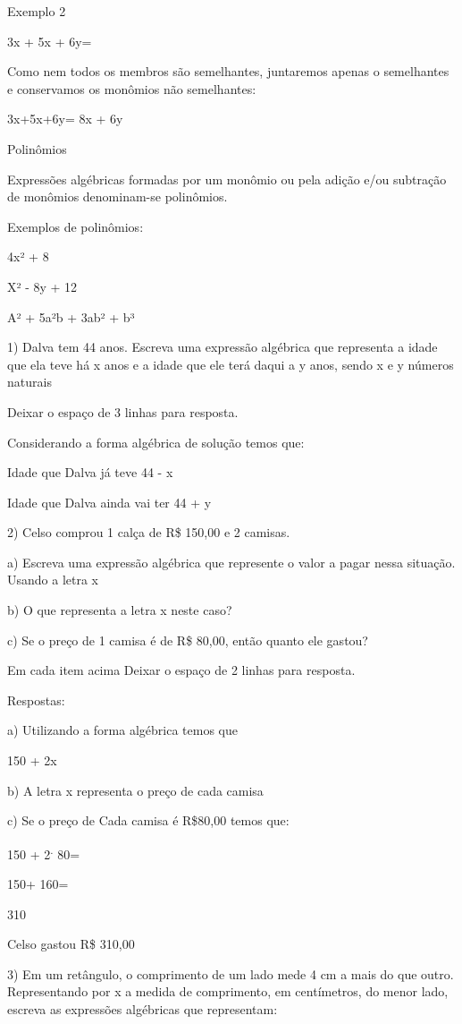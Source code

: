 {Exemplo 2

3x + 5x + 6y=

Como nem todos os membros são semelhantes, juntaremos apenas o
semelhantes e conservamos os monômios não semelhantes:

3x+5x+6y= 8x + 6y

Polinômios

Expressões algébricas formadas por um monômio ou pela adição e/ou
subtração de monômios denominam-se polinômios.

Exemplos de polinômios:

4x² + 8

X² - 8y + 12

A² + 5a²b + 3ab² + b³


1) Dalva tem 44 anos. Escreva uma expressão algébrica que representa a
idade que ela teve há x anos e a idade que ele terá daqui a y anos,
sendo x e y números naturais

Deixar o espaço de 3 linhas para resposta.

Considerando a forma algébrica de solução temos que:

Idade que Dalva já teve 44 - x

Idade que Dalva ainda vai ter 44 + y

2) Celso comprou 1 calça de R\$ 150,00 e 2 camisas.

a) Escreva uma expressão algébrica que represente o valor a pagar nessa
situação. Usando a letra x

b) O que representa a letra x neste caso?

c) Se o preço de 1 camisa é de R\$ 80,00, então quanto ele gastou?

Em cada item acima Deixar o espaço de 2 linhas para resposta.

Respostas:

a) Utilizando a forma algébrica temos que

150 + 2x

b) A letra x representa o preço de cada camisa

c) Se o preço de Cada camisa é R\$80,00 temos que:

150 + 2\textsuperscript{.} 80=

150+ 160=

310

Celso gastou R\$ 310,00

3) Em um retângulo, o comprimento de um lado mede 4 cm a mais do que
outro. Representando por x a medida de comprimento, em centímetros, do
menor lado, escreva as expressões algébricas que representam:

}
